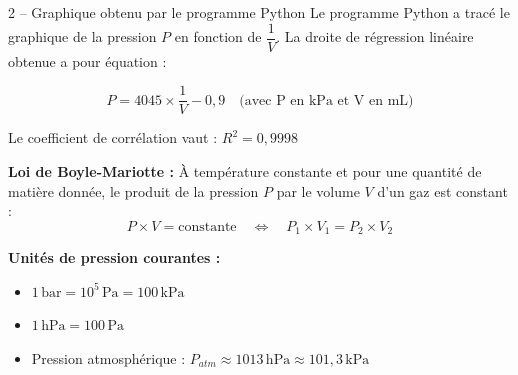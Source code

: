 \documentclass[11pt,a4paper]{article}
\begin{document}
\begin{documentbox}{2 -- Graphique obtenu par le programme Python}
Le programme Python a tracé le graphique de la pression $P$ en fonction de $\dfrac{1}{V}$. La droite de régression linéaire obtenue a pour équation :

$$P = 4045 \times \dfrac{1}{V} - 0{,}9 \quad \text{(avec P en kPa et V en mL)}$$

Le coefficient de corrélation vaut : $R^2 = 0{,}9998$

\vspace{3mm}

\begin{center}
\end{center}
\end{documentbox}

\vspace{3mm}

\begin{rappelbox}
\textbf{Loi de Boyle-Mariotte :} À température constante et pour une quantité de matière donnée, le produit de la pression $P$ par le volume $V$ d'un gaz est constant :
$$\boxed{P \times V = \text{constante}} \quad \Longleftrightarrow \quad P_1 \times V_1 = P_2 \times V_2$$

\textbf{Unités de pression courantes :}
\begin{itemize}[leftmargin=*]
    \item $1\,\text{bar} = 10^5\,\text{Pa} = 100\,\text{kPa}$
    \item $1\,\text{hPa} = 100\,\text{Pa}$
    \item Pression atmosphérique : $P_{atm} \approx 1013\,\text{hPa} \approx 101{,}3\,\text{kPa}$
\end{itemize}
\end{rappelbox}
\end{document}
